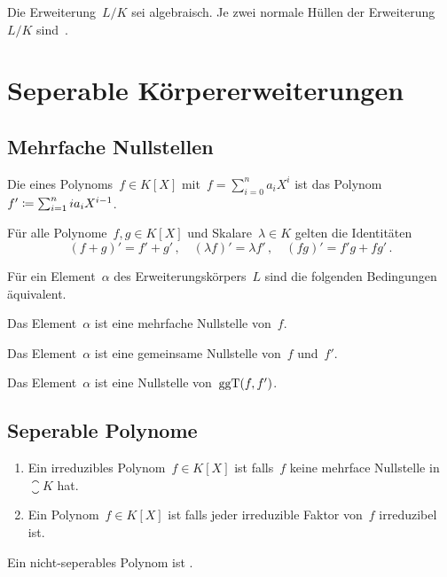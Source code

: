 \begin{proposition}
  Die Erweiterung~$L/K$ sei algebraisch.
  Je zwei normale Hüllen der Erweiterung~$L/K$ sind~.
\end{proposition}





\section{Seperable Körpererweiterungen}



\subsection{Mehrfache Nullstellen}

\begin{definition}
  Die  eines Polynoms~$f \in K[X]$ mit~$f = \sum_{i=0}^n a_i X^i$ ist das Polynom~$f' \coloneqq \sum_{i=1}^n i a_i X^{i-1}$.
\end{definition}

\begin{lemma}
  Für alle Polynome~$f, g \in K[X]$ und Skalare~$\lambda \in K$ gelten die Identitäten
  \[
    (f + g)' = f' + g' \,,
    \quad
    (\lambda f)' = \lambda f' \,,
    \quad
    (fg)' = f' g + f g' \,.
  \]
\end{lemma}

\begin{proposition}
  Für ein Element~$\alpha$ des Erweiterungskörpers~$L$ sind die folgenden Bedingungen äquivalent.
  \begin{equivlist}
    \item
      Das Element~$\alpha$ ist eine mehrfache Nullstelle von~$f$.
    \item
      Das Element~$\alpha$ ist eine gemeinsame Nullstelle von~$f$ und~$f'$.
    \item
      Das Element~$\alpha$ ist eine Nullstelle von~$\operatorname{ggT}(f,f')$.
  \end{equivlist}
\end{proposition}



\subsection{Seperable Polynome}

\begin{definition}
  \leavevmode
  \begin{enumerate}
    \item
      Ein irreduzibles Polynom~$f \in K[X]$ ist  falls~$f$ keine mehrface Nullstelle in~$\closure{K}$ hat.
    \item
      Ein Polynom~$f \in K[X]$ ist  falls jeder irreduzible Faktor von~$f$ irreduzibel ist.
  \end{enumerate}
  Ein nicht-seperables Polynom ist .
\end{definition}

